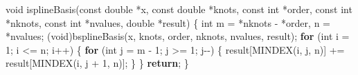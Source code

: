 \documentclass[
  12pt,
  letterpaper,
  DIV=11,
  numbers=noendperiod]{scrreprt}
\newenvironment{Shaded}{\begin{snugshade}}{\end{snugshade}}
\newcommand{\ControlFlowTok}[1]{\textcolor[rgb]{0.00,0.23,0.31}{\textbf{#1}}}
\newcommand{\DataTypeTok}[1]{\textcolor[rgb]{0.68,0.00,0.00}{#1}}
\newcommand{\DecValTok}[1]{\textcolor[rgb]{0.68,0.00,0.00}{#1}}
\newcommand{\NormalTok}[1]{\textcolor[rgb]{0.00,0.23,0.31}{#1}}
\newcommand{\OperatorTok}[1]{\textcolor[rgb]{0.37,0.37,0.37}{#1}}
\theoremstyle{remark}
\begin{document}
\begin{Shaded}
\begin{Highlighting}[]
\DataTypeTok{void}\NormalTok{ isplineBasis}\OperatorTok{(}\DataTypeTok{const} \DataTypeTok{double} \OperatorTok{*}\NormalTok{x}\OperatorTok{,} \DataTypeTok{const} \DataTypeTok{double} \OperatorTok{*}\NormalTok{knots}\OperatorTok{,} \DataTypeTok{const} \DataTypeTok{int} \OperatorTok{*}\NormalTok{order}\OperatorTok{,}
                  \DataTypeTok{const} \DataTypeTok{int} \OperatorTok{*}\NormalTok{nknots}\OperatorTok{,} \DataTypeTok{const} \DataTypeTok{int} \OperatorTok{*}\NormalTok{nvalues}\OperatorTok{,} \DataTypeTok{double} \OperatorTok{*}\NormalTok{result}\OperatorTok{)} \OperatorTok{\{}
    \DataTypeTok{int}\NormalTok{ m }\OperatorTok{=} \OperatorTok{*}\NormalTok{nknots }\OperatorTok{{-}} \OperatorTok{*}\NormalTok{order}\OperatorTok{,}\NormalTok{ n }\OperatorTok{=} \OperatorTok{*}\NormalTok{nvalues}\OperatorTok{;}
    \OperatorTok{(}\DataTypeTok{void}\OperatorTok{)}\NormalTok{bsplineBasis}\OperatorTok{(}\NormalTok{x}\OperatorTok{,}\NormalTok{ knots}\OperatorTok{,}\NormalTok{ order}\OperatorTok{,}\NormalTok{ nknots}\OperatorTok{,}\NormalTok{ nvalues}\OperatorTok{,}\NormalTok{ result}\OperatorTok{);}
    \ControlFlowTok{for} \OperatorTok{(}\DataTypeTok{int}\NormalTok{ i }\OperatorTok{=} \DecValTok{1}\OperatorTok{;}\NormalTok{ i }\OperatorTok{\textless{}=}\NormalTok{ n}\OperatorTok{;}\NormalTok{ i}\OperatorTok{++)} \OperatorTok{\{}
        \ControlFlowTok{for} \OperatorTok{(}\DataTypeTok{int}\NormalTok{ j }\OperatorTok{=}\NormalTok{ m }\OperatorTok{{-}} \DecValTok{1}\OperatorTok{;}\NormalTok{ j }\OperatorTok{\textgreater{}=} \DecValTok{1}\OperatorTok{;}\NormalTok{ j}\OperatorTok{{-}{-})} \OperatorTok{\{}
\NormalTok{            result}\OperatorTok{[}\NormalTok{MINDEX}\OperatorTok{(}\NormalTok{i}\OperatorTok{,}\NormalTok{ j}\OperatorTok{,}\NormalTok{ n}\OperatorTok{)]} \OperatorTok{+=}\NormalTok{ result}\OperatorTok{[}\NormalTok{MINDEX}\OperatorTok{(}\NormalTok{i}\OperatorTok{,}\NormalTok{ j }\OperatorTok{+} \DecValTok{1}\OperatorTok{,}\NormalTok{ n}\OperatorTok{)];}
        \OperatorTok{\}}
    \OperatorTok{\}}
    \ControlFlowTok{return}\OperatorTok{;}
\OperatorTok{\}}


\end{Highlighting}
\end{Shaded}
\end{document}
